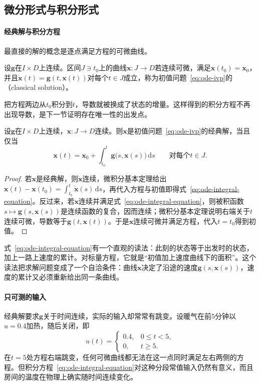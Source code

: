 \subsection{微分形式与积分形式}
\label{sec:ode-integral-form}

\paragraph{经典解与积分方程}
最直接的解的概念是逐点满足方程的可微曲线。

\begin{definition}[经典解]
  \label{def:ode-classical-solution}
  设$\bm g$在$I\times D$上连续。区间$J\ni t_0$上的曲线$\bm x:J\to D$若连续可微，满足$\bm x(t_0)=\bm x_0$，并且$\dot{\bm x}(t)=\bm g(t,\bm x(t))$对每个$t\in J$成立，称为初值问题~\eqref{eq:ode-ivp}的（classical solution）。
\end{definition}

把方程两边从$t_0$积分到$t$，导数就被换成了状态的增量。这样得到的积分方程不再出现导数，是下一节证明存在唯一性的出发点。

\begin{lemma}[经典解的积分刻画]
  \label{lem:ode-integral-equation}
  设$\bm g$在$I\times D$上连续，$\bm x:J\to D$连续。则$\bm x$是初值问题~\eqref{eq:ode-ivp}的经典解，当且仅当
  \begin{equation}
    \bm x(t)=\bm x_0+\int_{t_0}^t\bm g\bigl(s,\bm x(s)\bigr)\,\mathrm ds\qquad\text{对每个}t\in J.
    \label{eq:ode-integral-equation}
  \end{equation}
\end{lemma}

\begin{proof}
  若$\bm x$是经典解，则$\dot{\bm x}$连续，微积分基本定理给出$\bm x(t)-\bm x(t_0)=\int_{t_0}^t\dot{\bm x}(s)\,\mathrm ds$，再代入方程与初值即得式~\eqref{eq:ode-integral-equation}。反过来，若$\bm x$连续并满足式~\eqref{eq:ode-integral-equation}，则被积函数$s\mapsto\bm g(s,\bm x(s))$是连续函数的复合，因而连续；微积分基本定理说明右端关于$t$连续可微，导数等于$\bm g(t,\bm x(t))$。于是$\bm x$连续可微并满足方程，代入$t=t_0$得到初值。
\end{proof}

式~\eqref{eq:ode-integral-equation}有一个直观的读法：此刻的状态等于出发时的状态，加上一路上速度的累计。对标量方程，它就是“初值加上速度曲线下的面积”。这个读法把求解问题变成了一个自洽条件：曲线$\bm x$决定了沿途的速度$\bm g(s,\bm x(s))$，速度的累计又必须重新给出同一条曲线。

\paragraph{只可测的输入}
经典解要求$\bm g$关于时间连续，实际的输入却常常有跳变。设暖气在前$5$分钟以$u=0.4$加热，随后关闭，即
\[
  u(t)=\begin{cases}0.4,&0\leq t<5,\\0,&t\geq5.\end{cases}
\]
在$t=5$处方程右端跳变，任何可微曲线都无法在这一点同时满足左右两侧的方程。但积分方程~\eqref{eq:ode-integral-equation}对这种分段常值输入仍然有意义，而且房间的温度在物理上确实随时间连续变化。

